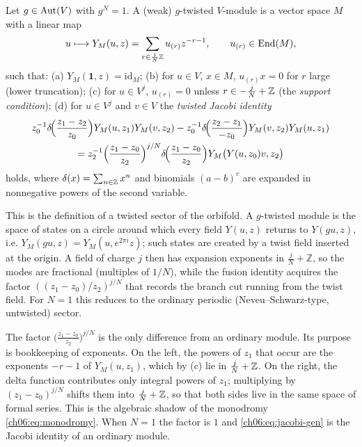 \begin{definition}\label{ch06:def:dlm}
Let $g\in\operatorname{Aut}(V)$ with $g^N=1$.  A (weak) $g$-twisted $V$-module is a vector space $M$ with a
linear map
\begin{equation*}
  u\longmapsto Y_M(u,z)=\sum_{r\in\frac1N{\mathbb{Z}}}u_{(r)}z^{-r-1},\qquad u_{(r)}\in\operatorname{End}(M),
\end{equation*}
such that: (a) $Y_M(\mathbf 1,z)=\mathrm{id}_M$; (b) for $u\in V$, $x\in M$, $u_{(r)}x=0$ for $r$
large (lower truncation); (c) for $u\in V^j$, $u_{(r)}=0$ unless $r\in-\tfrac jN+{\mathbb{Z}}$ (the
\emph{support condition}); (d) for $u\in V^j$ and $v\in V$ the \emph{twisted Jacobi identity}
\begin{multline}\label{ch06:eq:jacobi-gen}
  z_0^{-1}\delta\!\Bigl(\frac{z_1-z_2}{z_0}\Bigr)Y_M(u,z_1)Y_M(v,z_2)
  -z_0^{-1}\delta\!\Bigl(\frac{z_2-z_1}{-z_0}\Bigr)Y_M(v,z_2)Y_M(u,z_1)\\
  = z_2^{-1}\Bigl(\frac{z_1-z_0}{z_2}\Bigr)^{j/N}\delta\!\Bigl(\frac{z_1-z_0}{z_2}\Bigr)
     Y_M\bigl(Y(u,z_0)v,z_2\bigr)
\end{multline}
holds, where $\delta(x)=\sum_{n\in{\mathbb{Z}}}x^n$ and binomials $(a-b)^c$ are expanded in nonnegative
powers of the second variable.
\end{definition}

\begin{physics}
This is the definition of a twisted sector of the orbifold. A $g$-twisted module is the space of states on a circle around which every field $Y(u,z)$ returns to $Y(gu,z)$, i.e. $Y_M(gu,z)=Y_M(u,e^{2\pi i}z)$; such states are created by a twist field inserted at the origin. A field of charge $j$ then has expansion exponents in $\tfrac jN+\mathbb Z$, so the modes are fractional (multiples of $1/N$), while the fusion identity acquires the factor $((z_1-z_0)/z_2)^{j/N}$ that records the branch cut running from the twist field. For $N=1$ this reduces to the ordinary periodic (Neveu--Schwarz-type, untwisted) sector.
\end{physics}

The factor $\bigl(\frac{z_1-z_0}{z_2}\bigr)^{j/N}$ is the only difference from an ordinary
module.  Its purpose is bookkeeping of exponents.  On the left, the powers of $z_1$ that occur are
the exponents $-r-1$ of $Y_M(u,z_1)$, which by (c) lie in $\tfrac jN+{\mathbb{Z}}$.  On the right, the delta
function contributes only integral powers of $z_1$; multiplying by $(z_1-z_0)^{j/N}$ shifts them
into $\tfrac jN+{\mathbb{Z}}$, so that both sides live in the same space of formal series.  This is the
algebraic shadow of the monodromy \eqref{ch06:eq:monodromy}.  When $N=1$ the factor is $1$ and
\eqref{ch06:eq:jacobi-gen} is the Jacobi identity of an ordinary module.

